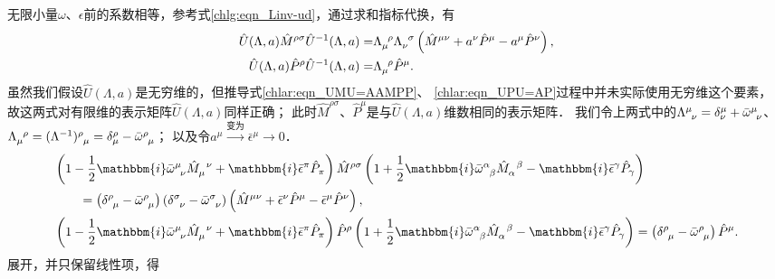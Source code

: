 无限小量$\omega$、$\epsilon$前的系数相等，参考式\eqref{chlg:eqn_Linv-ud}，通过求和指标代换，有
\begin{align}
	\hat{U}(\Lambda,a)\hat{M}^{\rho\sigma} \hat{U}^{-1}(\Lambda,a) =&
	\Lambda_{\mu}^{\hphantom{\nu}\rho} \Lambda_{\nu}^{\hphantom{\nu}\sigma}\left( \hat{M}^{\mu\nu}
	+ a^\nu  \hat{P}^{\mu}  - a^\mu  \hat{P}^{\nu}\right), \label{chlar:eqn_UMU=AAMPP}\\
	\hat{U}(\Lambda,a)\hat{P}^{\rho}\hat{U}^{-1}(\Lambda,a) =&
	\Lambda_{\mu}^{\hphantom{\nu}\rho}  \hat{P}^{\mu} . \label{chlar:eqn_UPU=AP}
\end{align}
虽然我们假设$\hat{U}(\Lambda,a)$是无穷维的，但推导式\eqref{chlar:eqn_UMU=AAMPP}、
\eqref{chlar:eqn_UPU=AP}过程中并未实际使用无穷维这个要素，
故这两式对有限维的表示矩阵$\hat{U}(\Lambda,a)$同样正确；
此时$\hat{M}^{\rho\sigma}$、$\hat{P}^{\mu}$是与$\hat{U}(\Lambda,a)$维数相同的表示矩阵．
我们令上两式中的$\Lambda^\mu_{\hphantom{\nu}\nu}=\delta^\mu_{\nu}
+\bar{\omega}^\mu_{\hphantom{\nu}\nu}$、
$\Lambda_\mu^{\hphantom{\mu}\rho}=(\Lambda^{-1})^\rho_{\hphantom{\rho}\mu}
=\delta^\rho_{\mu}-\bar{\omega}^\rho_{\hphantom{\rho}\mu}$；
以及令$a^\mu\xrightarrow{\text{变为}}\bar{\epsilon}^\mu\to 0$．
\begin{align*}
	&\left(1-\frac{1}{2}\mathbbm{i} \bar{\omega}^\mu_{\hphantom{\nu}\nu}
	\hat{M}^{\hphantom{\mu}\nu}_{\mu}+\mathbbm{i}\bar{\epsilon}^{\pi}\hat{P}_{\pi}\right)
	\hat{M}^{\rho\sigma} \left(1+\frac{1}{2}\mathbbm{i} \bar{\omega}^\alpha_{\hphantom{\alpha}\beta}
	\hat{M}^{\hphantom{\alpha}\beta}_{\alpha}-\mathbbm{i}\bar{\epsilon}^{\gamma}\hat{P}_{\gamma}\right) \\
	&\qquad =\left(\delta^\rho_{\hphantom{\rho}\mu} -\bar{\omega}^\rho_{\hphantom{\rho}\mu}\right)
	\left(\delta^\sigma_{\hphantom{\sigma}\nu} -\bar{\omega}^\sigma_{\hphantom{\sigma}\nu}\right)
	\left( \hat{M}^{\mu\nu}+ \bar{\epsilon}^\nu  \hat{P}^{\mu}  - \bar{\epsilon}^\mu  \hat{P}^{\nu}\right), \\
	&\left(1-\frac{1}{2}\mathbbm{i} \bar{\omega}^\mu_{\hphantom{\nu}\nu}
	\hat{M}^{\hphantom{\mu}\nu}_{\mu}+\mathbbm{i}\bar{\epsilon}^{\pi}\hat{P}_{\pi}\right)
	\hat{P}^{\rho} \left(1+\frac{1}{2}\mathbbm{i} \bar{\omega}^\alpha_{\hphantom{\alpha}\beta}
	\hat{M}^{\hphantom{\alpha}\beta}_{\alpha}-\mathbbm{i}\bar{\epsilon}^{\gamma}\hat{P}_{\gamma}\right) 
	= \left(\delta^\rho_{\hphantom{\rho}\mu} -\bar{\omega}^\rho_{\hphantom{\rho}\mu}\right)\hat{P}^{\mu} . 
\end{align*}
展开，并只保留线性项，得
